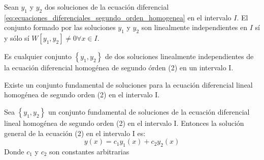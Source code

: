 \begin{theorem}
    Sean $y_1$ y $y_2$ dos soluciones de la ecuación diferencial \eqref{eq:ecuaciones_diferenciales_segundo_orden_homogenea} en el intervalo $I$. El conjunto formado por las soluciones $y_1$ y $y_2$ son linealmente independientes en $I$ sí y sólo sí $W[y_1,y_2]\neq 0\forall x\in I$.
\end{theorem}

\begin{definition}
    Es cualquier conjunto $\left\{y_1,y_2\right\}$ de dos soluciones linealmente independientes de la ecuación diferencial homogénea de segundo órden (2) en un intervalo I.
\end{definition}

\begin{theorem}
    Existe un conjunto fundamental de soluciones para la ecuación diferencial lineal homogénea de segundo orden (2) en el intervalo I.
\end{theorem}
\begin{theorem}
    Sea $\left\{y_1,y_2\right\}$ un conjunto fundamental de soluciones de la ecuación diferencial lineal homogénea de segundo orden (2) en el intervalo I. Entonces la solución general de la ecuación (2) en el intervalo I es:
    \begin{equation}
        y(x) = c_1y_1(x) +c_2y_2(x)
    \end{equation}
    Donde $c_1$ y $c_2$ son constantes arbitrarias
\end{theorem}

